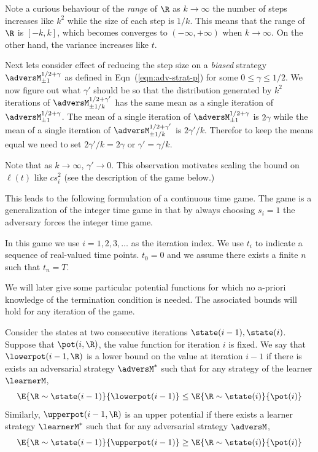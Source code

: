 Note a curious behaviour of the {\em range} of $\R$ as $k \to \infty$
the number of steps increases like $k^2$ while the size of each step
is $1/k$. This means that the range of $\R$ is $[-k,k]$, which becomes
converges to $(-\infty, + \infty)$ when $k \to \infty$. On the other
hand, the variance increases like $t$.

Next lets consider effect of reducing the step size on a {\em biased}
strategy $\adversM^{1/2+\gamma}_{\pm 1}$ as defined in
Eqn~(\ref{eqn:adv-strat-p}) for some
$0\leq \gamma \leq 1/2$.  We now figure out what  $\gamma'$ should be
so that the distribution generated by $k^2$ iterations of $\adversM^{1/2+\gamma'}_{\pm 1/k}$ has the
same mean as a single iteration of $\adversM^{1/2+\gamma}_{\pm
  1}$. The mean of a single iteration of
$\adversM^{1/2+\gamma}_{\pm 1}$ is $2\gamma$ while the mean of a
single iteration of $\adversM^{1/2+\gamma'}_{\pm 1/k}$ is
$2\gamma'/k$. Therefor to keep the means equal we need to set
$2\gamma'/k = 2\gamma$ or $\gamma' = \gamma/k$.


Note that as $k \to \infty$, $\gamma' \to 0$. This observation
motivates scaling the bound on $\ell(t)$ like $c s_i^2$ (see the
description of the game below.)

This leads to the following formulation of a continuous time game.
The game is a generalization of the integer time game in that by
always choosing $s_i=1$ the adversary forces the integer time game.

In this game we use $i=1,2,3,\ldots$ as the iteration index. We use
$t_i$ to indicate a sequence of real-valued time points. $t_0=0$ and
we assume there exists a finite $n$ such that $t_n = T$.

We will later give some particular potential functions for which no
a-priori knowledge of the termination condition is needed. The
associated bounds will hold for any iteration of the game.

\iffalse
Consider the states at two consecutive iterations $\state(i-1),\state(i)$.
Suppose that $\pot(i,\R)$, the value function for iteration $i$ is fixed.
We say that $\lowerpot(i-1,\R)$ is a lower bound on the value at iteration
$i-1$ if there is exists an adversarial strategy $\adversM^*$ such that
for any strategy of the learner $\learnerM$, 
$$ \E{\R \sim \state(i-1)}{\lowerpot(i-1)} \leq \E{\R \sim \state(i)}{\pot(i)}$$
Similarly, $\upperpot(i-1,\R)$ is an upper potential if there exists a
learner strategy $\learnerM^*$ such that for any adversarial strategy
$\adversM$,
$$ \E{\R \sim \state(i-1)}{\upperpot(i-1)} \geq \E{\R \sim \state(i)}{\pot(i)}$$




